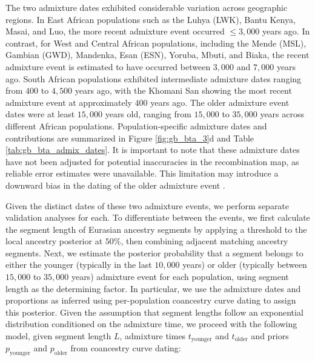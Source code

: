 The two admixture dates exhibited considerable variation across geographic regions. In East African populations such as the Luhya (LWK), Bantu Kenya, Masai, and Luo, the more recent admixture event occurred $\leq 3{,}000$ years ago. In contrast, for West and Central African populations, including the Mende (MSL), Gambian (GWD), Mandenka, Esan (ESN), Yoruba, Mbuti, and Biaka, the recent admixture event is estimated to have occurred between $3{,}000$ and $7{,}000$ years ago. South African populations exhibited intermediate admixture dates ranging from $400$ to $4{,}500$ years ago, with the Khomani San showing the most recent admixture event at approximately $400$ years ago. The older admixture event dates were at least $15{,}000$ years old, ranging from $15{,}000$ to $35{,}000$ years across different African populations. Population-specific admixture dates and contributions are summarized in Figure \ref{fig:gb_bta_3}d and Table \ref{tab:gb_bta_admix_dates}. It is important to note that these admixture dates have not been adjusted for potential inaccuracies in the recombination map, as reliable error estimates were unavailable. This limitation may introduce a downward bias in the dating of the older admixture event \cite{sankararaman2012date}.

Given the distinct dates of these two admixture events, we perform separate validation analyses for each. To differentiate between the events, we first calculate the segment length of Eurasian ancestry segments by applying a threshold to the local ancestry posterior at \(50\)\%, then combining adjacent matching ancestry segments. Next, we estimate the posterior probability that a segment belongs to either the younger (typically in the last $10{,}000$ years) or older (typically between $15{,}000$ to $35{,}000$ years) admixture event for each population, using segment length as the determining factor. In particular, we use the admixture dates and proportions as inferred using per-population coancestry curve dating to assign this posterior. Given the assumption that segment lengths follow an exponential distribution conditioned on the admixture time, we proceed with the following model, given segment length $L$, admixture times $t_{\text{younger}}$ and $t_{\text{older}}$ and priors $p_{\text{younger}}$ and $p_{\text{older}}$ from coancestry curve dating:

